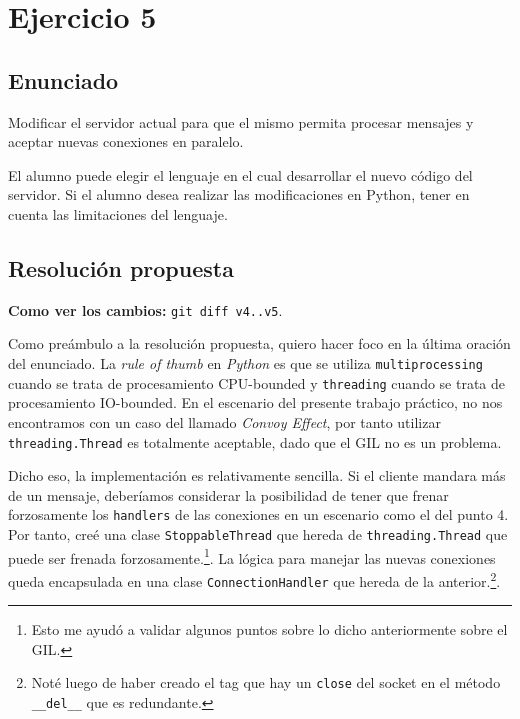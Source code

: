 \documentclass{article}
\begin{document}
\section{Ejercicio 5}

\subsection{Enunciado}
Modificar el servidor actual para que el mismo permita procesar mensajes y aceptar nuevas conexiones en paralelo.

El alumno puede elegir el lenguaje en el cual desarrollar el nuevo código del servidor. Si el alumno desea realizar las modificaciones en Python, tener en cuenta las limitaciones del lenguaje.

\subsection{Resolución propuesta}

\textbf{Como ver los cambios: }\texttt{git diff v4..v5}.

Como preámbulo a la resolución propuesta, quiero hacer foco en la última oración del enunciado. La \textit{rule of thumb} en \textit{Python} es que se utiliza \texttt{multiprocessing} cuando se trata de procesamiento CPU-bounded y \texttt{threading} cuando se trata de procesamiento IO-bounded. En el escenario del presente trabajo práctico, no nos encontramos con un caso del llamado \textit{Convoy Effect}\cite{ConvoyEffect}, por tanto utilizar \texttt{threading.Thread} es totalmente aceptable\cite{TTM}, dado que el GIL no es un problema.

Dicho eso, la implementación es relativamente sencilla. Si el cliente mandara más de un mensaje, deberíamos considerar la posibilidad de tener que frenar forzosamente los \texttt{handlers} de las conexiones en un escenario como el del punto 4. Por tanto, creé una clase \texttt{StoppableThread} que hereda de \texttt{threading.Thread} que puede ser frenada forzosamente.\footnote{Esto me ayudó a validar algunos puntos sobre lo dicho anteriormente sobre el GIL.}. La lógica para manejar las nuevas conexiones queda encapsulada en una clase \texttt{ConnectionHandler} que hereda de la anterior.\footnote{Noté luego de haber creado el tag que hay un \texttt{close} del socket en el método \texttt{\_\_del\_\_} que es redundante.}.

\printbibliography
\end{document}
